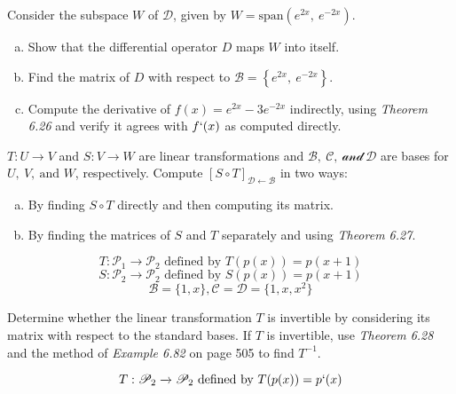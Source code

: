 \documentclass[11pt,letterpaper,boxed]{pset}
\begin{document}
    
    \begin{problem} [6.6 \#14]
    Consider the subspace $W$ of $\mathscr{D}$, given by $W=\textrm{span}\left(e^{2x},\: e^{-2x}\right)$.
    \begin{enumerate} [(a)]
        \item Show that the differential operator $D$ maps $W$ into itself.
        \item Find the matrix of $D$ with respect to $\mathscr{B}=\left\{e^{2x},\:e^{-2x}\right\}$.
        \item Compute the derivative of $f(x) = e^{2x} - 3e^{-2x}$ indirectly, using \textit{Theorem 6.26} and verify it agrees with $f`(x)$ as computed directly.
    \end{enumerate}
    
    \end{problem}
    \newpage
    
    
    
    \begin{problem} [6.6 \# 18]
    $T: U \xrightarrow{} V $ and $S: V \xrightarrow{} W $  are linear transformations and $\mathscr{B,\:C,\: \textrm{and}\: D}$ are bases for $U,\:V,\: \textrm{and }W$, respectively. Compute $[S\circ T]_{\mathscr{D}\xleftarrow{}\mathscr{B}}$ in two ways:
    
    \begin{enumerate} [(a)]
        \item By finding $S\circ T$ directly and then computing its matrix.
        \item By finding the matrices of $S$ and $T$ separately and using \textit{Theorem 6.27}.
    \end{enumerate}
    
    \[ T: \mathscr{P}_1 \xrightarrow{} \mathscr{P}_2 \textrm{ defined by } T(p(x)) = p(x+1) \]
    \[ S:\mathscr{P}_2 \xrightarrow{} \mathscr{P}_2 \textrm{ defined by } S(p(x)) = p(x+1) \]
    \[ \mathscr{B} = \{1,x\}, \mathscr{C}=\mathscr{D}=\{1,x,x^2\} \]
    
    \end{problem}
    \newpage
    
    
    \begin{problem} [6.6 \#22]
    Determine whether the linear transformation $T$ is invertible by considering its matrix with respect to the standard bases. If $T$ is invertible, use \textit{Theorem 6.28} and the method of \textit{Example 6.82} on page 505 to find $T^{-1}$.
    
    \[T:\mathscr{P}_2 \xrightarrow{} \mathscr{P}_2 \textrm{ defined by } T(p(x)) = p`(x)\]
    
    \end{problem}
    \newpage
    
\end{document}
